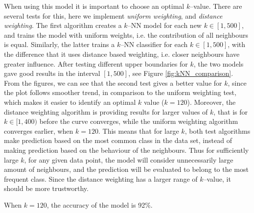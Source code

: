     When using this model it is important to choose an optimal $k$--value. There are several tests for this, here we implement \emph{uniform weighting}, and \emph{distance weighting}. The first algorithm creates a $k$--NN model for each new $k \in [1, 500]$, and trains the model with uniform weights, i.e. the contribution of all neighbours is equal. Similarly, the latter trains a $k$--NN classifier for each $k \in [1, 500]$, with the difference that it uses distance based weighting, i.e. closer neighbours have greater influence. After testing different upper boundaries for $k$, the two models gave good results in the interval $[1,500]$, see Figure \ref{fig:kNN_comparison}. From the figures, we can see that the second test gives a better value for $k$, since the plot follows smoother trend, in comparison to the uniform weighting test, which makes it easier to identify an optimal $k$ value ($k = 120$). Moreover, the distance weighting algorithm is providing results for larger values of $k$, that is for $k \in [1, 400)$ before the curve converges, while the uniform weighting algorithm converges earlier, when $k = 120$. This means that for large $k$, both test algorithms make prediction based on the most common class in the data set, instead of making prediction based on the behaviour of the neighbours. Thus for sufficiently large $k$, for any given data point, the model will consider unnecessarily large amount of neighbours, and the prediction will be evaluated to belong to the most frequent class. Since the distance weighting has a larger range of $k$--value, it should be more trustworthy.

    When $k = 120$, the accuracy of the model is 92\%.
    
